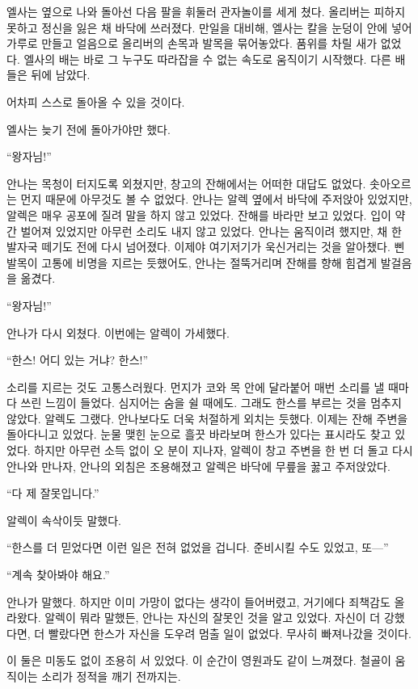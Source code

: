엘사는 옆으로 나와 돌아선 다음 팔을 휘둘러 관자놀이를 세게 쳤다. 올리버는 피하지 못하고 정신을 잃은 채 바닥에 쓰러졌다. 만일을 대비해, 엘사는 칼을 눈덩이 안에 넣어 가루로 만들고 얼음으로 올리버의 손목과 발목을 묶어놓았다. 품위를 차릴 새가 없었다. 엘사의 배는 바로 그 누구도 따라잡을 수 없는 속도로 움직이기 시작했다. 다른 배들은 뒤에 남았다.

어차피 스스로 돌아올 수 있을 것이다.

엘사는 늦기 전에 돌아가야만 했다.

\textbreak

\forceindent``왕자님!''

안나는 목청이 터지도록 외쳤지만, 창고의 잔해에서는 어떠한 대답도 없었다. 솟아오르는 먼지 때문에 아무것도 볼 수 없었다. 안나는 알렉 옆에서 바닥에 주저앉아 있었지만, 알렉은 매우 공포에 질려 말을 하지 않고 있었다. 잔해를 바라만 보고 있었다. 입이 약간 벌어져 있었지만 아무런 소리도 내지 않고 있었다. 안나는 움직이려 했지만, 채 한 발자국 떼기도 전에 다시 넘어졌다. 이제야 여기저기가 욱신거리는 것을 알아챘다. 삔 발목이 고통에 비명을 지르는 듯했어도, 안나는 절뚝거리며 잔해를 향해 힘겹게 발걸음을 옮겼다.

``왕자님!''

안나가 다시 외쳤다. 이번에는 알렉이 가세했다.

``한스! 어디 있는 거냐? 한스!''

소리를 지르는 것도 고통스러웠다. 먼지가 코와 목 안에 달라붙어 매번 소리를 낼 때마다 쓰린 느낌이 들었다. 심지어는 숨을 쉴 때에도. 그래도 한스를 부르는 것을 멈추지 않았다. 알렉도 그랬다. 안나보다도 더욱 처절하게 외치는 듯했다. 이제는 잔해 주변을 돌아다니고 있었다. 눈물 맺힌 눈으로 흘끗 바라보며 한스가 있다는 표시라도 찾고 있었다. 하지만 아무런 소득 없이 오 분이 지나자, 알렉이 창고 주변을 한 번 더 돌고 다시 안나와 만나자, 안나의 외침은 조용해졌고 알렉은 바닥에 무릎을 꿇고 주저앉았다.

``다 제 잘못입니다.''

알렉이 속삭이듯 말했다.

``한스를 더 믿었다면 이런 일은 전혀 없었을 겁니다. 준비시킬 수도 있었고, 또—''

``계속 찾아봐야 해요.''

안나가 말했다. 하지만 이미 가망이 없다는 생각이 들어버렸고, 거기에다 죄책감도 올라왔다. 알렉이 뭐라 말했든, 안나는 자신의 잘못인 것을 알고 있었다. 자신이 더 강했다면, 더 빨랐다면 한스가 자신을 도우려 멈출 일이 없었다. 무사히 빠져나갔을 것이다.

이 둘은 미동도 없이 조용히 서 있었다. 이 순간이 영원과도 같이 느껴졌다. 철골이 움직이는 소리가 정적을 깨기 전까지는.

